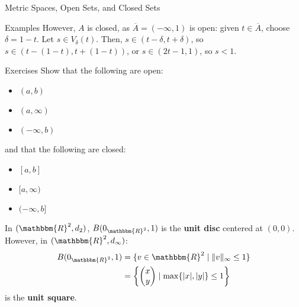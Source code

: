 \documentclass[10pt]{extarticle}
\newcommand{\R}{\mathbbm{R}}
\begin{document}
\begin{problem}{Metric Spaces, Open Sets, and Closed Sets}
\begin{problem}{Examples}
      However, $A$ is closed, as $\overline{A} = (-\infty,1)$ is open: given $t\in \overline{A}$, choose $\delta = 1-t$. Let $s\in V_{\delta}(t)$. Then, $s\in (t-\delta, t+\delta)$, so $s\in (t-(1-t),t + (1-t))$, or $s\in(2t-1,1)$, so $s < 1$.
    \end{problem}
    \begin{problem}{Exercises}
      Show that the following are open:
      \begin{itemize}
        \item $(a,b)$
        \item $(a,\infty)$
        \item $(-\infty,b)$
      \end{itemize}
      and that the following are closed:
      \begin{itemize}
        \item $[a,b]$
        \item $[a,\infty)$
        \item $(-\infty,b]$
      \end{itemize}
    \end{problem}
    In $(\R^2,d_2)$, $B(0_{\R^2},1)$ is the \textbf{unit disc} centered at $(0,0)$.\\

    However, in $(\R^2,d_{\infty})$:
    \begin{align*}
      B(0_{\R^2},1) &= \{v\in\R^2 \mid \Vert v \Vert_{\infty} \leq 1\}\\
                    &= \left\{\begin{pmatrix}x\\y\end{pmatrix}\mid \max\{|x|,|y|\}\leq 1\right\}
    \end{align*}
    is the \textbf{unit square}.
  \end{problem}
\end{document}
